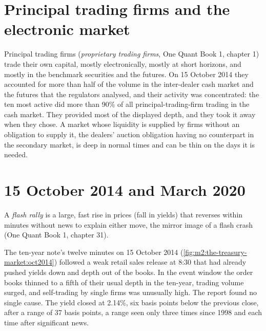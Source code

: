 \section{Principal trading firms and the electronic market}

Principal trading firms (\emph{proprietary trading firms}, One Quant Book 1,
chapter 1) trade their own capital, mostly electronically, mostly at short
horizons, and mostly in the benchmark securities and the futures. On 15
October 2014 they accounted for more than half of the volume in the
inter-dealer cash market and the futures that the regulators analysed, and
their activity was concentrated: the ten most active did more than 90\% of
all principal-trading-firm trading in the cash market. They provided most of
the displayed depth, and they took it away when they chose. A market whose
liquidity is supplied by firms without an obligation to supply it, the
dealers' auction obligation having no counterpart in the secondary market, is
deep in normal times and can be thin on the days it is needed.

\section{15 October 2014 and March 2020}

\begin{definition}\label{def:m2:the-treasury-market:flash}
A \emph{flash rally} is a large, fast rise in prices (fall
in yields) that reverses within minutes without news to explain either move,
the mirror image of a flash crash (One Quant Book 1, chapter 31).
\end{definition}

The ten-year note's twelve minutes on 15 October 2014
(\cref{fig:m2:the-treasury-market:oct2014}) followed a weak retail sales
release at 8:30 that had already pushed yields down and depth out of the
books. In the event window the order books thinned to a fifth of their usual
depth in the ten-year, trading volume surged, and self-trading by single firms
was unusually high. The report found no single cause. The yield closed at
2.14\%, six basis points below the previous close, after a range of 37 basis
points, a range seen only three times since 1998 and each time after
significant news.

